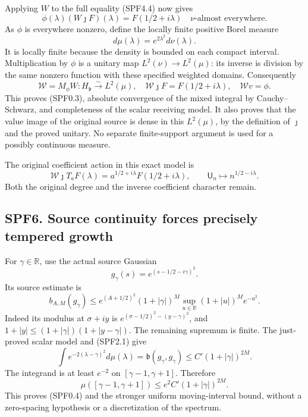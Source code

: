 Applying \(W\) to the full equality (SPF4.4) now gives \[
\phi(\lambda)(W\jmath F)(\lambda)=F(1/2+i\lambda)
\quad\nu\text{-almost everywhere}.
\tag{SPF5.3}
\] As \(\phi\) is everywhere nonzero, define the locally finite positive
Borel measure \[
\boxed{d\mu(\lambda)=e^{2\lambda^2}d\nu(\lambda).}
\tag{SPF5.4}
\] It is locally finite because the density is bounded on each compact
interval. Multiplication by \(\phi\) is a unitary map
\(L^2(\nu)\to L^2(\mu)\): its inverse is division by the same nonzero
function with these specified weighted domains. Consequently \[
\mathcal W=M_\phi W:H_{\mathfrak b}\xrightarrow{\sim}L^2(\mu),
\quad\mathcal W\jmath F=F(1/2+i\lambda),
\quad\mathcal Wv=\phi.
\tag{SPF5.5}
\] This proves (SPF0.3), absolute convergence of the mixed integral by
Cauchy--Schwarz, and completeness of the scalar receiving model. It also
proves that the value image of the original source is dense in this
\(L^2(\mu)\), by the definition of \(\jmath\) and the proved unitary. No
separate finite-support argument is used for a possibly continuous
measure.

The original coefficient action in this exact model is \[
\mathcal W\jmath T_aF(\lambda)
=a^{1/2+i\lambda}F(1/2+i\lambda),
\qquad
\mathsf U_n\longmapsto n^{1/2-i\lambda}.
\tag{SPF5.6}
\] Both the original degree and the inverse coefficient character
remain.

\subsection{SPF6. Source continuity forces precisely tempered
growth}\label{spf6.-source-continuity-forces-precisely-tempered-growth}

For \(\gamma\in\mathbb R\), use the actual source Gaussian \[
g_\gamma(s)=e^{(s-1/2-i\gamma)^2}.
\] Its source estimate is \[
b_{A,M}(g_\gamma)\le
e^{(A+1/2)^2}(1+|\gamma|)^M
\sup_{u\in\mathbb R}(1+|u|)^Me^{-u^2}.
\tag{SPF6.1}
\] Indeed its modulus at \(\sigma+iy\) is
\(e^{(\sigma-1/2)^2-(y-\gamma)^2}\), and
\(1+|y|\le(1+|\gamma|)(1+|y-\gamma|)\). The remaining supremum is
finite. The just-proved scalar model and (SPF2.1) give \[
\int e^{-2(\lambda-\gamma)^2}d\mu(\lambda)
=\mathfrak b(g_\gamma,g_\gamma)
\le C'(1+|\gamma|)^{2M}.
\tag{SPF6.2}
\] The integrand is at least \(e^{-2}\) on \([\gamma-1,\gamma+1]\).
Therefore \[
\mu([\gamma-1,\gamma+1])\le e^2C'(1+|\gamma|)^{2M}.
\tag{SPF6.3}
\] This proves (SPF0.4) and the stronger uniform moving-interval bound,
without a zero-spacing hypothesis or a discretization of the spectrum.

